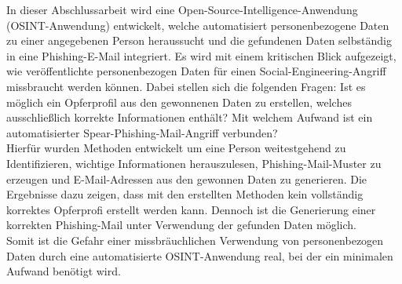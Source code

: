 \label{cha:kurzfassung} 
In dieser Abschlussarbeit wird eine Open-Source-Intelligence-Anwendung (OSINT-Anwendung) entwickelt, welche automatisiert personenbezogene Daten zu einer angegebenen Person heraussucht und die gefundenen Daten selbständig in eine Phishing-E-Mail integriert. Es wird mit einem kritischen Blick aufgezeigt, wie veröffentlichte personenbezogen Daten für einen Social-Engineering-Angriff missbraucht werden können. Dabei stellen sich die folgenden Fragen: Ist es möglich ein Opferprofil aus den gewonnenen Daten zu erstellen, welches ausschließlich korrekte Informationen enthält? Mit welchem Aufwand ist ein automatisierter Spear-Phishing-Mail-Angriff verbunden?\\
Hierfür wurden Methoden entwickelt um eine Person weitestgehend zu Identifizieren, wichtige Informationen herauszulesen, Phishing-Mail-Muster zu erzeugen und E-Mail-Adressen aus den gewonnen Daten zu generieren. Die Ergebnisse dazu zeigen, dass mit den erstellten Methoden kein vollständig korrektes Opferprofi erstellt werden kann. Dennoch ist die Generierung einer korrekten Phishing-Mail unter Verwendung der gefunden Daten möglich.\\
Somit ist die Gefahr einer missbräuchlichen Verwendung von personenbezogen Daten durch eine automatisierte OSINT-Anwendung real, bei der ein minimalen Aufwand benötigt wird.



